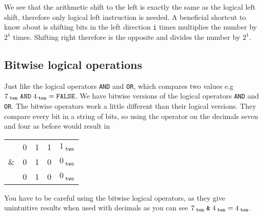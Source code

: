         We see that the arithmetic shift to the left is exactly the same as the logical left shift, therefore only logical left instruction is needed.
        A beneficial shortcut to know about is shifting bits in the left direction \texttt{i} times multiplies the number by $2^\texttt{i}$ times. Shifting right therefore is the opposite and divides the number by $2^\texttt{i}$.
        
    \subsection{Bitwise logical operations}
        Just like the logical operators \texttt{AND} and \texttt{OR}, which compares two values e.g $7_{\; \texttt{\scriptsize ten}} \; \texttt{AND} \; 4_{\; \texttt{\scriptsize ten}} = \texttt{FALSE}$. We have bitwise versions of the logical operators \texttt{AND} and \texttt{OR}. The bitwise operators work a little different than their logical versions. They compare every bit in a string of bits, so using the operator on the decimals seven and four as before would result in
        
        \begin{center}
            \begin{tabular}{c@{\,}c@{\,}c@{\,}c@{\,}c}
            	   & 0 & 1 & 1 & $1_{\; \texttt{two}}$ \\
            	\& & 0 & 1 & 0 & $0_{\; \texttt{two}}$ \\ \hline
            	   & 0 & 1 & 0 & $0_{\; \texttt{two}}$
            \end{tabular}
        \end{center}
        
        You have to be careful using the bitwise logical operators, as they give unintuitive results when used with decimals as you can see $7_{\; \texttt{\scriptsize ten}} \; \texttt{\&} \; 4_{\; \texttt{\scriptsize ten}} = 4_{\; \texttt{\scriptsize ten}}$.
        
